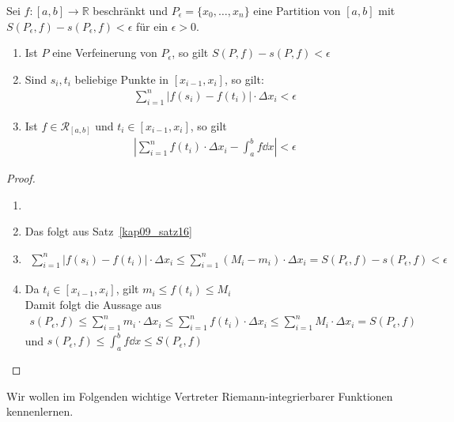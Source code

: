 \begin{Satz}{\label{kap10_satz19}
	Sei $f:[a,b] \rightarrow \mathbb{R}$ beschränkt und $P_{\epsilon} = 
	\{x_0, \hdots, x_n\}$ eine Partition von $[a,b]$ mit $S(P_{\epsilon},f) -
	s(P_{\epsilon},f) < \epsilon$ für ein $\epsilon > 0$.
	\begin{enumerate}
		\item Ist $P$ eine Verfeinerung von $P_{\epsilon}$, so gilt 
		$S(P,f) - s(P,f) < \epsilon$
		\item Sind $s_i, t_i$ beliebige Punkte in $[x_{i-1},x_i]$, so gilt:
		\begin{align*}
			\sum_{i=1}^n \left\vert f(s_i) - f(t_i) \right\vert \cdot 
			\Delta x_i < \epsilon
		\end{align*}
		\item Ist $f \in \mathcal{R}_{[a,b]}$ und $t_i \in [x_{i-1},x_i]$, so 
		gilt 
		\begin{align*}
			\left\vert \sum_{i=1}^n f(t_i) \cdot \Delta x_i - \int_a^b f \dd{x} 
			\right\vert < \epsilon
		\end{align*}
	\end{enumerate}	
}\end{Satz}

\begin{proof}
	\begin{enumerate}
		\item[ ]
		\item Das folgt aus Satz~\ref{kap09_satz16}
		\item
		 \begin{align*}
			\sum_{i = 1}^n \left\vert f(s_i) - f(t_i) \right\vert	\cdot 
			\Delta x_i \leq \sum_{i=1}^n (M_i-m_i)\cdot \Delta x_i
			= S(P_{\epsilon},f) - s(P_{\epsilon},f) < \epsilon
		 \end{align*}
		 \item Da $t_i \in [x_{i-1},x_i]$, gilt $m_i \leq f(t_i) \leq M_i$ \\
		 	Damit folgt die Aussage aus
			 \begin{align*}
			 	s(P_{\epsilon},f ) \leq  
			 	\sum_{i = 1}^n m_i \cdot \Delta x_i \leq \sum_{i=1}^n f(t_i) \cdot \Delta 
			 	x_i \leq \sum_{i=1}^n M_i \cdot \Delta x_i = S(P_{\epsilon},f)
			 \end{align*}
			 und $s(P_{\epsilon},f) \leq \int_a^b f \dd{x} \leq S(P_{\epsilon},f)$
	\end{enumerate}
\end{proof}
	Wir wollen im Folgenden wichtige Vertreter Riemann-integrierbarer 
	Funktionen kennenlernen.

